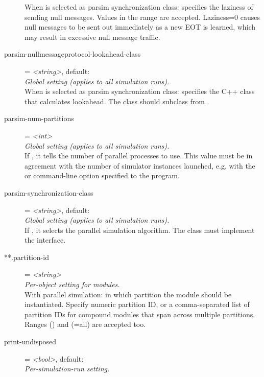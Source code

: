 \begin{description}
    When  is selected as parsim synchronization
    class: specifies the laziness of sending null messages. Values in the range
    \ttt{[0,{\allowbreak}1)} are accepted. Laziness=0 causes null messages to
    be sent out immediately as a new EOT is learned, which may result in
    excessive null message traffic.
\item[parsim-nullmessageprotocol-lookahead-class] = \textit{<string>}, default: \\
    \textit{Global setting (applies to all simulation runs).}\\
    When  is selected as parsim synchronization
    class: specifies the C++ class that calculates lookahead. The class should
    subclass from .
\item[parsim-num-partitions] = \textit{<int>}\\
    \textit{Global setting (applies to all simulation runs).}\\
    If , it tells the
    number of parallel processes to use. This value must be in agreement with
    the number of simulator instances launched, e.g. with the
     or  command-line option
    specified to the  program.
\item[parsim-synchronization-class] = \textit{<string>}, default: \\
    \textit{Global setting (applies to all simulation runs).}\\
    If , it selects the
    parallel simulation algorithm. The class must implement the
     interface.
\item[**.partition-id] = \textit{<string>}\\
    \textit{Per-object setting for modules.}\\
    With parallel simulation: in which partition the module should be
    instantiated. Specify numeric partition ID, or a comma-separated list of
    partition IDs for compound modules that span across multiple partitions.
    Ranges () and \ttt{*} (=all) are accepted too.
\item[print-undisposed] = \textit{<bool>}, default: \\
    \textit{Per-simulation-run setting.}\\

\end{description}
